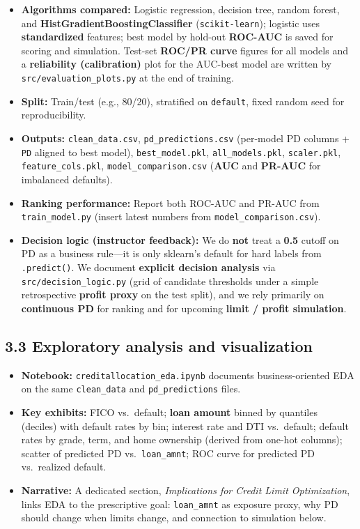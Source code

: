 \documentclass[12pt,letterpaper]{report}
\begin{document}
\begin{itemize}
    \item \textbf{Algorithms compared:} Logistic regression, decision tree, random forest, and \textbf{HistGradientBoostingClassifier} (\texttt{scikit-learn}); logistic uses \textbf{standardized} features; best model by hold-out \textbf{ROC-AUC} is saved for scoring and simulation. Test-set \textbf{ROC/PR curve} figures for all models and a \textbf{reliability (calibration)} plot for the AUC-best model are written by \texttt{src/evaluation\_plots.py} at the end of training.
    \item \textbf{Split:} Train/test (e.g., 80/20), stratified on \texttt{default}, fixed random seed for reproducibility.
    \item \textbf{Outputs:} \texttt{clean\_data.csv}, \texttt{pd\_predictions.csv} (per-model PD columns + \texttt{PD} aligned to best model), \texttt{best\_model.pkl}, \texttt{all\_models.pkl}, \texttt{scaler.pkl}, \texttt{feature\_cols.pkl}, \texttt{model\_comparison.csv} (\textbf{AUC} and \textbf{PR-AUC} for imbalanced defaults).
    \item \textbf{Ranking performance:} Report both ROC-AUC and PR-AUC from \texttt{train\_model.py} (insert latest numbers from \texttt{model\_comparison.csv}).
    \item \textbf{Decision logic (instructor feedback):} We do \textbf{not} treat a \textbf{0.5} cutoff on PD as a business rule---it is only sklearn's default for hard labels from \texttt{.predict()}. We document \textbf{explicit decision analysis} via \texttt{src/decision\_logic.py} (grid of candidate thresholds under a simple retrospective \textbf{profit proxy} on the test split), and we rely primarily on \textbf{continuous PD} for ranking and for upcoming \textbf{limit / profit simulation}.
\end{itemize}

\subsection*{3.3 Exploratory analysis and visualization}

\begin{itemize}
    \item \textbf{Notebook:} \texttt{creditallocation\_eda.ipynb} documents business-oriented EDA on the same \texttt{clean\_data} and \texttt{pd\_predictions} files.
    \item \textbf{Key exhibits:} FICO vs.\ default; \textbf{loan amount} binned by quantiles (deciles) with default rates by bin; interest rate and DTI vs.\ default; default rates by grade, term, and home ownership (derived from one-hot columns); scatter of predicted PD vs.\ \texttt{loan\_amnt}; ROC curve for predicted PD vs.\ realized default.
    \item \textbf{Narrative:} A dedicated section, \textit{Implications for Credit Limit Optimization}, links EDA to the prescriptive goal: \texttt{loan\_amnt} as exposure proxy, why PD should change when limits change, and connection to simulation below.
\end{itemize}
\end{document}
